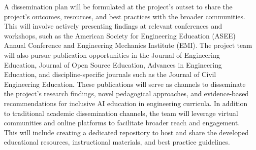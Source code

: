 \documentclass[11pt]{article}
\begin{document}
A dissemination plan will be formulated at the project's outset to share the project's outcomes, resources, and best practices with the broader communities. 
This will involve actively presenting findings at relevant conferences and workshops, such as the American Society for Engineering Education (ASEE) Annual Conference and Engineering Mechanics Institute (EMI).
The project team will also pursue publication opportunities in the Journal of Engineering Education, Journal of Open Source Education, Advances in Engineering Education, and discipline-specific journals such as the Journal of Civil Engineering Education. 
These publications will serve as channels to disseminate the project's research findings, novel pedagogical approaches, and evidence-based recommendations for inclusive AI education in engineering curricula.
In addition to traditional academic dissemination channels, the team will leverage virtual communities and online platforms to facilitate broader reach and engagement. This will include creating a dedicated repository to host and share the developed educational resources, instructional materials, and best practice guidelines. 
\end{document}

